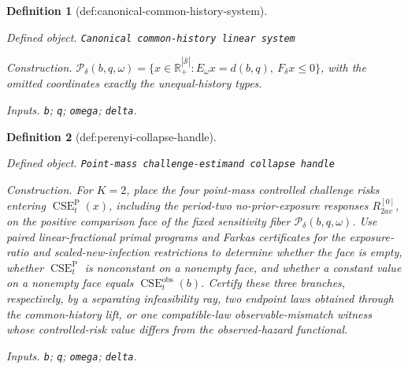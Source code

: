 \documentclass{article}
\newtheorem{definition}{Definition}
\begin{document}
\begin{definition}[def:canonical-common-history-system]\label{def:canonical-common-history-system}
\par\smallskip\noindent\emph{Defined object.} \texttt{Canonical common-\allowbreak{}history linear system}
\par\smallskip\noindent\emph{Construction.} \(\mathcal P_\delta(b,q,\omega)=\{x\in\mathbb R_+^{|\overline{\mathcal S}|}:E_\omega x=d(b,q),\ F_\delta x\leq0\}\), with the omitted coordinates exactly the unequal-history types.
\par\smallskip\noindent\emph{Inputs.} \texttt{b}; \texttt{q}; \texttt{omega}; \texttt{delta}.
\end{definition}

\begin{definition}[def:perenyi-collapse-handle]\label{def:perenyi-collapse-handle}
\par\smallskip\noindent\emph{Defined object.} \texttt{Point-\allowbreak{}mass challenge-\allowbreak{}estimand collapse handle}
\par\smallskip\noindent\emph{Construction.} For \(K=2\), place the four point-mass controlled challenge risks entering \(\operatorname{CSE}^{\mathrm P}_t(x)\), including the period-two no-prior-exposure responses \(R^{[0]}_{2av}\), on the positive comparison face of the fixed sensitivity fiber \(\mathcal P_\delta(b,q,\omega)\). Use paired linear-fractional primal programs and Farkas certificates for the exposure-ratio and scaled-new-infection restrictions to determine whether the face is empty, whether \(\operatorname{CSE}^{\mathrm P}_t\) is nonconstant on a nonempty face, and whether a constant value on a nonempty face equals \(\operatorname{CSE}^{\mathrm{obs}}_t(b)\). Certify these three branches, respectively, by a separating infeasibility ray, two endpoint laws obtained through the common-history lift, or one compatible-law observable-mismatch witness whose controlled-risk value differs from the observed-hazard functional.
\par\smallskip\noindent\emph{Inputs.} \texttt{b}; \texttt{q}; \texttt{omega}; \texttt{delta}.
\end{definition}
\end{document}
